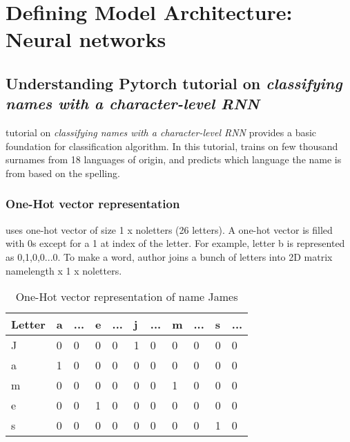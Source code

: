 \chapter{Defining Model Architecture: Neural networks} \label{sec:feature-extraction}

\section{Understanding Pytorch tutorial on \textit{classifying names with a character-level \acs{RNN}} } \label{sec:chRNN}

\parencite{sean} tutorial on \textit{classifying names with a character-level \acs{RNN}} provides a basic foundation for classification algorithm. In this tutorial,  trains on few thousand surnames from 18 languages of origin, and predicts which language the name is from based on the spelling.
\subsection{One-Hot vector representation}
 uses one-hot vector of size 1 x no\textunderscore letters (26 letters). A one-hot vector is filled with 0s except for a 1 at index of the letter. For example, letter b is represented as 0,1,0,0...0. To make a word, author joins a bunch of letters into 2D matrix name\textunderscore length x 1 x no\textunderscore letters.

\begin{table}[h]
    \centering
    \caption{One-Hot vector representation of name James}
    \label{table:feature_imputation}
    \begin{tabular}{ lllllllllll }
          \toprule
          
          \textbf{Letter}& \textbf{a} & \textbf{...}& \textbf{e}&\textbf{...}&\textbf{j}&\textbf{...}&\textbf{m}&\textbf{...}&\textbf{s}&\textbf{...}\\
          \midrule
          J&0 & 0& 0& 0&1& 0& 0& 0& 0& 0\\
          a&1 & 0& 0& 0&0& 0& 0& 0& 0& 0\\         
          m&0 & 0& 0& 0&0& 0& 1& 0& 0& 0\\
          e&0 & 0& 1& 0&0& 0& 0& 0& 0& 0\\
          s&0 & 0& 0& 0&0& 0& 0& 0& 1& 0\\           
        
          \bottomrule
          \end{tabular}
\end{table}
\clearpage
